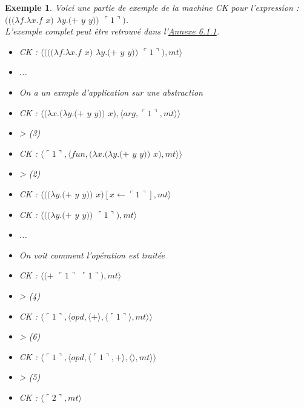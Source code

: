 \documentclass[10pt,a4paper]{report}
\newtheorem{ex}{Exemple}
\begin{document}
\begin{ex}
	Voici une partie de exemple de la machine CK pour l'expression : 
	$(((\lambda f.\lambda x.f$ $x)$ $\lambda y.(+$ $y$ $y))$ $\ulcorner 1\urcorner)$.
	\\ L'exemple complet peut être retrouvé dans l'\hyperref[CK]{Annexe 6.1.1}.
	
	\begin{multicols}{2}\raggedright{
			\begin{itemize}
				\item[] CK : $\langle(((\lambda f.\lambda x.f$ $x)$ $\lambda y.(+$ $y$ $y))$ $\ulcorner 1\urcorner),mt\rangle$
				\item[] ...
				\item[] On a un exmple d'application sur une abstraction
				\item[] CK : $\langle(\lambda x.(\lambda y.(+$ $y$ $y))$ $x),\langle arg,\ulcorner 1\urcorner,mt\rangle\rangle$	
				\item[] > (3) 
				\item[] CK : $\langle\ulcorner 1\urcorner,\langle fun,(\lambda x.(\lambda y.(+$ $y$ $y))$ $x),mt\rangle\rangle$
				\item[] > (2) 
				\item[] CK : $\langle((\lambda y.(+$ $y$ $y))$ $x)[x \leftarrow \ulcorner 1\urcorner ],mt\rangle$
				\item[] CK : $\langle((\lambda y.(+$ $y$ $y))$ $\ulcorner 1\urcorner),mt\rangle$
			\end{itemize}
			
			\begin{itemize}
				\item[] ...
				\item[] On voit comment l'opération est traitée
				\item[] CK : $\langle(+$ $\ulcorner 1\urcorner$ $\ulcorner 1\urcorner),mt\rangle$
				\item[] > (4)
				\item[] CK : $\langle\ulcorner 1\urcorner,\langle opd,\langle + \rangle,\langle\ulcorner 1\urcorner\rangle,mt\rangle\rangle$
				\item[] > (6) 
				\item[] CK : $\langle\ulcorner 1\urcorner,\langle opd,\langle\ulcorner 1\urcorner,+ \rangle,\langle\rangle,mt\rangle\rangle$
				\item[] > (5) 
				\item[] CK : $\langle\ulcorner 2\urcorner,mt\rangle$
			\end{itemize}
		}
	\end{multicols}
	
\end{ex}
\end{document}
